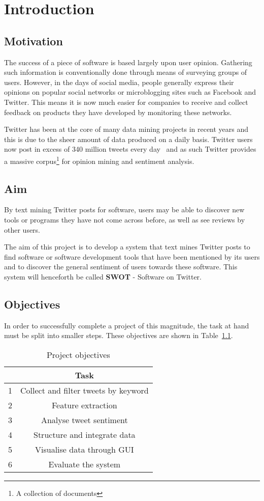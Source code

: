 \chapter{Introduction}
\label{cha:intro}

\section{Motivation}
The success of a piece of software is based largely upon user opinion. Gathering such information is conventionally done through means of surveying groups of users. However, in the days of social media, people generally express their opinions on popular social networks or microblogging sites such as Facebook and Twitter. This means it is now much easier for companies to receive and collect feedback on products they have developed by monitoring these networks.

Twitter has been at the core of many data mining projects in recent years and this is due to the sheer amount of data produced on a daily basis. Twitter users now post in excess of 340 million tweets every day~\cite{twitterblog} and as such Twitter provides a massive corpus\footnote{A collection of documents} for opinion mining and sentiment analysis.

\section{Aim}
\label{sec:aim}
By text mining Twitter posts for software, users may be able to discover new tools or programs they have not come across before, as well as see reviews by other users.

The aim of this project is to develop a system that text mines Twitter posts to find software or software development tools that have been mentioned by its users and to discover the general sentiment of users towards these software. This system will henceforth be called \textbf{SWOT} - Software on Twitter.

\section{Objectives}
In order to successfully complete a project of this magnitude, the task at hand must be split into smaller steps.  These objectives are shown in Table~\ref{objectives}.

\begin{table}
\begin{center}
\begin{tabular}{|r|c|}\hline\hline
&Task\\\hline
1&Collect and filter tweets by keyword\\
2&Feature extraction\\
3&Analyse tweet sentiment\\
4&Structure and integrate data\\
5&Visualise data through GUI\\
6&Evaluate the system\\\hline\hline
\end{tabular}
\end{center}
\caption{Project objectives}\label{objectives}
\end{table}

